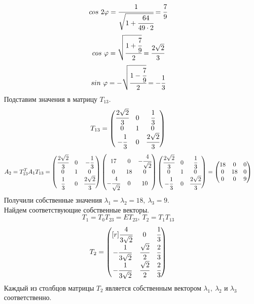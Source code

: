 \documentclass[12pt]{article}
\theoremstyle{definition}
\numberwithin{equation}{section}
\begin{document}
	$$cos ~2\varphi=\cfrac{1}{\sqrt{1+\cfrac{64}{49\cdot 2}}}=\cfrac{7}{9}$$
	$$cos ~\varphi=\sqrt{\cfrac{1+\cfrac{7}{9}}{2}}=\cfrac{2\sqrt{2}}{3}$$
	$$sin ~\varphi=-\sqrt{\cfrac{1-\cfrac{7}{9}}{2}}=-\cfrac{1}{3}$$
	Подставим значения в матрицу $T_{13}$.
	\[T_{13} = \begin{pmatrix}
	\cfrac{2\sqrt{2}}{3} & 0 & \cfrac{1}{3}\\
	0 & 1 & 0\\
	-\cfrac{1}{3} & 0 & \cfrac{2\sqrt{2}}{3}\\
	\end{pmatrix}\]
	\[A_2= T_{13}^T A_1 T_{13}=\begin{pmatrix}
	\cfrac{2\sqrt{2}}{3} & 0 & -\cfrac{1}{3}\\
	0 & 1 & 0\\
	\cfrac{1}{3} & 0 & \cfrac{2\sqrt{2}}{3}\\
	\end{pmatrix} \begin{pmatrix}
	17 & 0 & -\cfrac{4}{\sqrt{2}}\\
	0 & 18 & 0\\
	-\cfrac{4}{\sqrt{2}} & 0 & 10\\
	\end{pmatrix} \begin{pmatrix}
	\cfrac{2\sqrt{2}}{3} & 0 & \cfrac{1}{3}\\
	0 & 1 & 0\\
	-\cfrac{1}{3} & 0 & \cfrac{2\sqrt{2}}{3}\\
	\end{pmatrix}=\begin{pmatrix}
	18 & 0 & 0\\
	0 & 18 & 0\\
	0 & 0 & 9\\
	\end{pmatrix}\]
	Получили собственные значения $\lambda_1=\lambda_2=18,~\lambda_3=9$.\\
	Найдем соответствующие собственные векторы.
	$$T_1=T_0T_{23}=ET_{23},~T_2=T_1T_{13}$$
	\[T_2 = \begin{pmatrix}[r]
	\cfrac{4}{3\sqrt{2}} & 0 & \cfrac{1}{3}\\
	-\cfrac{1}{3\sqrt{2}} & \cfrac{\sqrt{2}}{2} & \cfrac{2}{3}\\
	-\cfrac{1}{3\sqrt{2}} & \cfrac{\sqrt{2}}{2} & \cfrac{2}{3}\\
	\end{pmatrix}\]
	Каждый из столбцов матрицы $T_2$ является собственным вектором $\lambda_1,~\lambda_2$ и $\lambda_3$ соответственно.\\ \\
\end{document}
